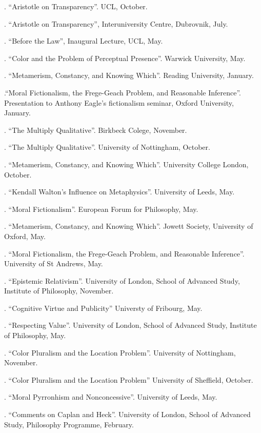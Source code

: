 \documentclass[11pt]{article}
\begin{document}
. ``Aristotle on Transparency''. UCL, October.

. ``Aristotle on Transparency'', Interuniversity Centre, Dubrovnik, July.

. ``Before the Law'', Inaugural Lecture, UCL, May.

.  ``Color and the Problem of Perceptual Presence''. Warwick University, May.

. ``Metamerism, Constancy, and Knowing Which''. Reading University, January.

.``Moral Fictionalism, the Frege-Geach Problem, and Reasonable Inference''. Presentation to Anthony Eagle's fictionalism seminar, Oxford University, January.

. ``The Multiply Qualitative''. Birkbeck Colege, November.

. ``The Multiply Qualitative''. University of Nottingham, October.

. ``Metamerism, Constancy, and Knowing Which''. University College London, October.

. ``Kendall Walton's Influence on Metaphysics''. University of Leeds, May.

. ``Moral Fictionalism''. European Forum for Philosophy, May.

. ``Metamerism, Constancy, and Knowing Which''. Jowett Society, University of Oxford, May.

. ``Moral Fictionalism, the Frege-Geach Problem, and Reasonable Inference''. University of St Andrews, May.

. ``Epistemic Relativism''. University of London, School of Advanced Study, Institute of Philosophy, November.

. ``Cognitive Virtue and Publicity'' Universty of Fribourg, May. 

. ``Respecting Value''. University of London, School of Advanced Study, Institute of Philosophy, May.

. ``Color Pluralism and the Location Problem''. University of Nottingham, November.

. ``Color Pluralism and the Location Problem'' University of Sheffield, October.

. ``Moral Pyrronhism and Nonconcessive''. University of Leeds, May.

. ``Comments on Caplan and Heck''. University of London, School of Advanced Study, Philosophy Programme, February.
\end{document}
